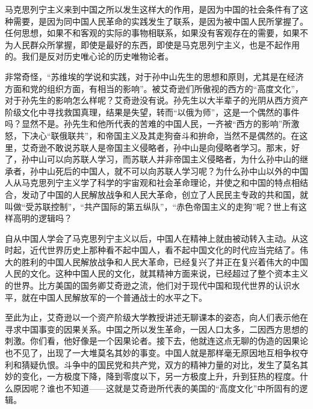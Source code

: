马克思列宁主义来到中国之所以发生这样大的作用，是因为中国的社会条件有了这种需要，是因为同中国人民革命的实践发生了联系，是因为被中国人民所掌握了。任何思想，如果不和客观的实际的事物相联系，如果没有客观存在的需要，如果不为人民群众所掌握，即使是最好的东西，即使是马克思列宁主义，也是不起作用的。我们是反对历史唯心论的历史唯物论者。

非常奇怪，“苏维埃的学说和实践，对于孙中山先生的思想和原则，尤其是在经济方面和党的组织方面，有相当的影响”。被艾奇逊们所傲视的西方的“高度文化”，对于孙先生的影响怎么样呢？艾奇逊没有说。孙先生以大半辈子的光阴从西方资产阶级文化中寻找救国真理，结果是失望，转而“以俄为师”，这是一个偶然的事件吗？显然不是。孙先生和他所代表的苦难的中国人民，一齐被“西方的影响”所激怒，下决心“联俄联共”，和帝国主义及其走狗奋斗和拚命，当然不是偶然的。在这里，艾奇逊不敢说苏联人是帝国主义侵略者，孙中山是向侵略者学习。那末，好了，孙中山可以向苏联人学习，而苏联人并非帝国主义侵略者，为什么孙中山的继承者，孙中山死后的中国人，就不可以向苏联人学习呢？为什么孙中山以外的中国人从马克思列宁主义学了科学的宇宙观和社会革命理论，并使之和中国的特点相结合，发动了中国的人民解放战争和人民大革命，创立了人民民主专政的共和国，就叫做“受苏联控制”，“共产国际的第五纵队”，“赤色帝国主义的走狗”呢？世上有这样高明的逻辑吗？

自从中国人学会了马克思列宁主义以后，中国人在精神上就由被动转入主动。从这时起，近代世界历史上那种看不起中国人，看不起中国文化的时代应当完结了。伟大的胜利的中国人民解放战争和人民大革命，已经复兴了并正在复兴着伟大的中国人民的文化。这种中国人民的文化，就其精神方面来说，已经超过了整个资本主义的世界。比方美国的国务卿艾奇逊之流，他们对于现代中国和现代世界的认识水平，就在中国人民解放军的一个普通战士的水平之下。

至此为止，艾奇逊以一个资产阶级大学教授讲述无聊课本的姿态，向人们表示他在寻求中国事变的因果关系。中国之所以发生革命，一因人口太多，二因西方思想的刺激。你们看，他好像是一个因果论者。接下去，他就连这点无聊的伪造的因果论也不见了，出现了一大堆莫名其妙的事变。中国人就是那样毫无原因地互相争权夺利和猜疑仇恨。斗争中的国民党和共产党，双方的精神力量的对比，发生了莫名其妙的变化，一方极度下降，降到零度以下，另一方极度上升，升到狂热的程度。什么原因呢？谁也不知道——这就是艾奇逊所代表的美国的“高度文化”中所固有的逻辑。



